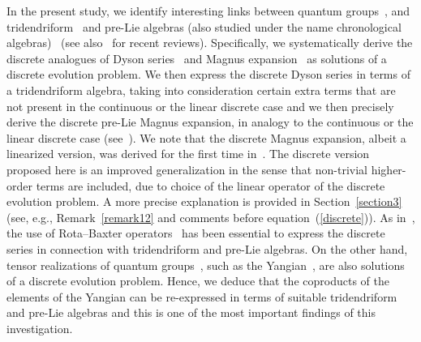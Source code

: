 \documentclass[pdftex]{sigma}
\numberwithin{equation}{section}
\theoremstyle{definition}
\begin{document}
In the present study, we identify interesting links between quantum groups~\cite{Drinfeld, Jimbo, FadTakRes}, and tridendriform~\cite{Dendri, Loday} and pre-Lie algebras (also studied under the name chronological algebras)~\mbox{\cite{Chrono, PreLie, Pre1}} (see also~\cite{Bai, Manchon} for recent reviews). Specifically, we systematically derive the discrete analogues of Dyson series~\cite{Dyson} and Magnus expansion~\cite{Magnus} as solutions of a discrete evolution problem. We then express the discrete Dyson series in terms of a tridendriform algebra, taking into consideration certain extra terms that are not present in the continuous or the linear discrete case and we then precisely derive the discrete pre-Lie Magnus expansion, in analogy to the continuous or the linear discrete case (see~\cite{EbraMan, new3, new4}). We note that the discrete Magnus expansion, albeit a linearized version, was derived for the first time in~\cite{EbraMan}. The discrete version proposed here is an improved generalization in the sense that non-trivial higher-order terms are included, due to choice of the linear operator of the discrete evolution problem. A more precise explanation is provided in Section~\ref{section3}
 (see, e.g., Remark~\ref{remark12} and comments before equation~(\ref{discrete})). As in~\cite{EbraMan}, the use of Rota--Baxter operators~\cite{Rota, Rota2, Rota3} has been essential to express the discrete series in connection with tridendriform and pre-Lie algebras. On the other hand, tensor realizations of quantum groups~\cite{ Drinfeld, Drinfeld1, Drinfeld2, FadTakRes}, such as the Yangian~\cite{Chari, Drinfeld, Drinfeld1, Drinfeld2, Molev}, are also solutions of a discrete evolution problem. Hence, we deduce that the coproducts of the elements of the Yangian can be re-expressed in terms of suitable tridendriform and pre-Lie algebras and this is one of the most important findings of this investigation.
\end{document}
